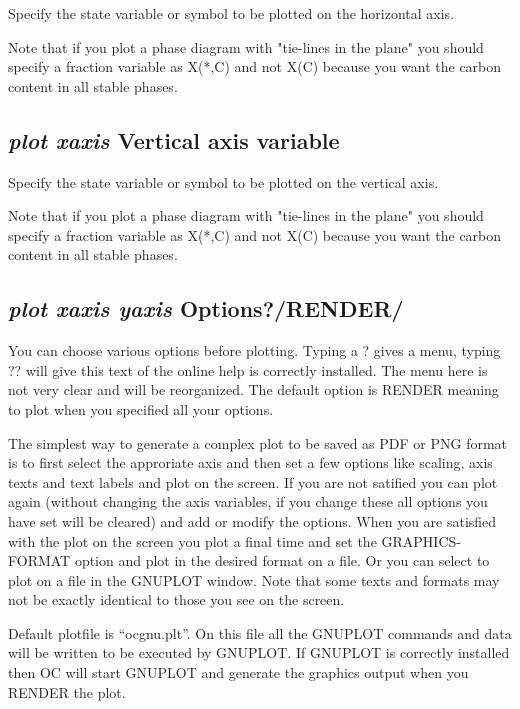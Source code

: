 \documentclass[11pt]{article}
\begin{document}
Specify the state variable or symbol to be plotted on the horizontal axis.

Note that if you plot a phase diagram with "tie-lines in the plane"
you should specify a fraction variable as X(*,C) and not X(C)
because you want the carbon content in all stable phases.

\hypertarget{Vertical axis variable}{}
\subsection{{\em plot xaxis} Vertical axis variable}

Specify the state variable or symbol to be plotted on the vertical axis.

Note that if you plot a phase diagram with "tie-lines in the plane"
you should specify a fraction variable as X(*,C) and not X(C) because
you want the carbon content in all stable phases.

\hypertarget{Plot}{}
\hypertarget{Plot options}{}
\subsection{{\em plot xaxis yaxis} Options?/RENDER/}

You can choose various options before plotting. Typing a ? gives a
menu, typing ?? will give this text of the online help is correctly
installed.  The menu here is not very clear and will be reorganized.
The default option is RENDER meaning to plot when you specified all
your options.

The simplest way to generate a complex plot to be saved as PDF or PNG
format is to first select the approriate axis and then set a few
options like scaling, axis texts and text labels and plot on the
screen.  If you are not satified you can plot again (without changing
the axis variables, if you change these all options you have set will
be cleared) and add or modify the options.  When you are satisfied
with the plot on the screen you plot a final time and set the
GRAPHICS-FORMAT option and plot in the desired format on a file.  Or
you can select to plot on a file in the GNUPLOT window.  Note that
some texts and formats may not be exactly identical to those you see
on the screen.

Default plotfile is ``ocgnu.plt''.  On this file all the GNUPLOT
commands and data will be written to be executed by GNUPLOT.  If
GNUPLOT is correctly installed then OC will start GNUPLOT and generate
the graphics output when you RENDER the plot.
\end{document}
